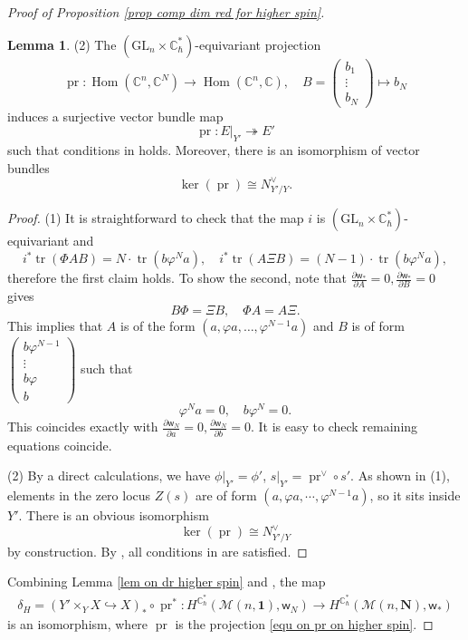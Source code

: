 \documentclass[10pt]{amsart}
\theoremstyle{definition}
\newtheorem{Lemma}[Theorem]{Lemma}
\numberwithin{equation}{section}
\newcommand{\C}{\mathbb{C}}
\newcommand{\GL}{\mathrm{GL}}
\newcommand{\Crit}{\mathrm{Crit}}
\newcommand{\bC}{\mathbb{C}}
\newcommand{\cM}{\mathcal{M}}
\newcommand{\sw}{\mathsf{w}}
\newcommand{\Hom}{\operatorname{Hom}}
\newcommand{\pr}{\operatorname{pr}}
\newcommand{\tr}{\operatorname{tr}}
\begin{document}
\begin{proof}[Proof of Proposition \ref{prop comp dim red for higher spin}]
\begin{Lemma}
(2) The $(\GL_n\times \bC^*_\hbar)$-equivariant projection 
$$\pr\colon \Hom(\C^n,\C^N)\to \Hom(\C^n,\C), \quad B=\begin{pmatrix}
b_1 \\ 
\vdots \\
b_N \end{pmatrix}\mapsto b_N$$
induces a surjective vector bundle map 
\begin{equation}\label{equ on pr on higher spin}\pr\colon E|_{Y'}\twoheadrightarrow E' \end{equation}
such that conditions in \cite[Def.~6.2]{COZZ} holds. Moreover, there is an isomorphism of vector bundles
$$\ker(\pr)\cong N^\vee_{Y'/Y}. $$
\end{Lemma}
\begin{proof}
(1) It is straightforward to check that the map $i$ is $(\GL_n\times \bC^*_\hbar)$-equivariant and 
$$i^*\tr(\Phi A B )=N\cdot \tr(b\varphi^N a), \quad   i^*\tr(A\Xi B)=(N-1)\cdot \tr(b\varphi^N a), $$
therefore the first claim holds. To show the second, note that 
$\frac{\partial \sw_*}{\partial A}=0,  \frac{\partial \sw_*}{\partial B}=0$ gives  
$$B  \Phi=\Xi  B, \quad \Phi A=A \Xi. $$
This implies that $A$ is of the form $(a,\varphi a,\ldots, \varphi^{N-1}a)$ and $B$ is of form $\begin{pmatrix}
b\varphi^{N-1} \\ 
\vdots \\
b\varphi \\
b \end{pmatrix}$ 
such that 
$$\varphi^{N}a=0, \quad  b\varphi^{N}=0. $$
This coincides exactly with $\frac{\partial \sw_{N}}{\partial a}=0,  \frac{\partial \sw_{N}}{\partial b}=0$. 
It is easy to check remaining equations coincide. 

(2) By a direct calculations, we have $\phi|_{Y'}=\phi'$, $s|_{Y'}=\pr^\vee\circ s'$.  
As shown in (1), elements in the zero locus $Z(s)$ are of form $(a,\varphi a,\cdots, \varphi^{N-1}a)$, 
so it sits inside $Y'$.
There is an obvious isomorphism $$\ker(\pr)\cong N^\vee_{Y'/Y}$$ by construction. 
By \cite[Prop.~6.4]{COZZ}, all conditions in \cite[Def.~6.2]{COZZ} are satisfied. 
\end{proof}
Combining Lemma \ref{lem on dr higher spin} and \cite[Prop.~6.9]{COZZ}, the map 
\begin{align*}
    \delta_H=(Y'\times_Y X\hookrightarrow X)_*\circ \pr^*\colon H^{\bC^*_\hbar}(\cM(n,\mathbf 1),\sw_N)\to H^{\bC^*_\hbar}(\cM(n,\mathbf N),\sw_*)
\end{align*}
is an isomorphism, where $\pr$ is the projection \eqref{equ on pr on higher spin}. 


\end{proof}
\end{document}
